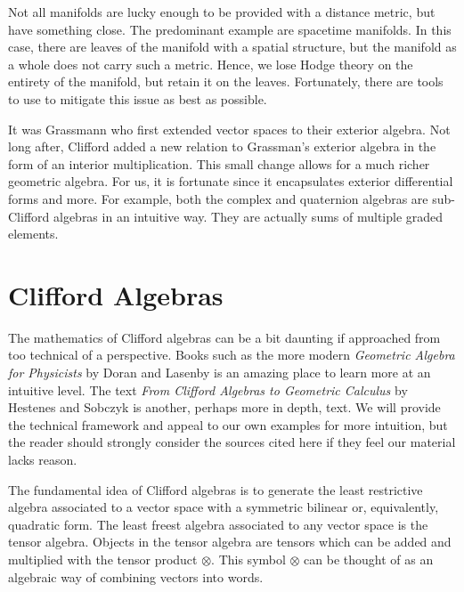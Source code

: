 \documentclass{article}
\begin{document}
Not all manifolds are lucky enough to be provided with a distance metric, but have something close. 
The predominant example are spacetime manifolds. 
In this case, there are leaves of the manifold with a spatial structure, but the manifold as a whole does not carry such a metric. 
Hence, we lose Hodge theory on the entirety of the manifold, but retain it on the leaves. 
Fortunately, there are tools to use to mitigate this issue as best as possible.

It was Grassmann who first extended vector spaces to their exterior algebra. 
Not long after, Clifford added a new relation to Grassman's exterior algebra in the form of an interior multiplication. 
This small change allows for a much richer geometric algebra. 
For us, it is fortunate since it encapsulates exterior differential forms and more. 
For example, both the complex and quaternion algebras are sub-Clifford algebras in an intuitive way. 
They are actually sums of multiple graded elements.


\section{Clifford Algebras}\label{sec:clifford_algebras}
The mathematics of Clifford algebras can be a bit daunting if approached from too technical of a perspective. Books such as the more modern \emph{Geometric Algebra for Physicists} by Doran and Lasenby \cite{doran_geometric_2003} is an amazing place to learn more at an intuitive level. The text \emph{From Clifford Algebras to Geometric Calculus} by Hestenes and Sobczyk \cite{hestenes_clifford_1984} is another, perhaps more in depth, text. We will provide the technical framework and appeal to our own examples for more intuition, but the reader should strongly consider the sources cited here if they feel our material lacks reason.

The fundamental idea of Clifford algebras is to generate the least restrictive algebra associated to a vector space with a symmetric bilinear or, equivalently, quadratic form. The least freest algebra associated to any vector space is the tensor algebra. Objects in the tensor algebra are tensors which can be added and multiplied with the tensor product $\otimes$. This symbol $\otimes$ can be thought of as an algebraic way of combining vectors into words.
\end{document}
